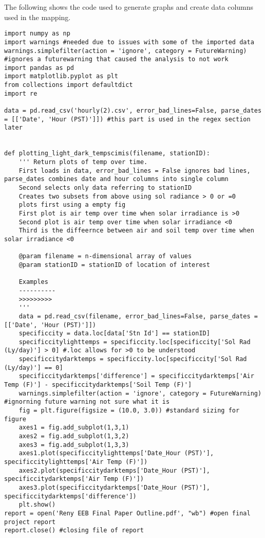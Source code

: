 \documentclass[letterpaper]{article}
\begin{document}
The following shows the code used to generate graphs and create data columns used in the mapping. 
\begin{lstlisting}
import numpy as np
import warnings #needed due to issues with some of the imported data 
warnings.simplefilter(action = 'ignore', category = FutureWarning) #ignores a futurewarning that caused the analysis to not work
import pandas as pd
import matplotlib.pyplot as plt
from collections import defaultdict
import re 

data = pd.read_csv('hourly(2).csv', error_bad_lines=False, parse_dates = [['Date', 'Hour (PST)']]) #this part is used in the regex section later


def plotting_light_dark_tempscimis(filename, stationID):
    ''' Return plots of temp over time.
    First loads in data, error_bad_lines = False ignores bad lines, parse_dates combines date and hour columns into single column
    Second selects only data referring to stationID
    Creates two subsets from above using sol radiance > 0 or =0
    plots first using a empty fig
    First plot is air temp over time when solar irradiance is >0
    Second plot is air temp over time when solar irradiance <0
    Third is the diffeernce between air and soil temp over time when solar irradiance <0
    
    @param filename = n-dimensional array of values
    @param stationID = stationID of location of interest
    
    Examples
    ----------
    >>>>>>>>> 
    ''' 
    data = pd.read_csv(filename, error_bad_lines=False, parse_dates = [['Date', 'Hour (PST)']])
    specificcity = data.loc[data['Stn Id'] == stationID]
    specificcitylighttemps = specificcity.loc[specificcity['Sol Rad (Ly/day)'] > 0] #.loc allows for >0 to be understood
    specificcitydarktemps = specificcity.loc[specificcity['Sol Rad (Ly/day)'] == 0]
    specificcitydarktemps['difference'] = specificcitydarktemps['Air Temp (F)'] - specificcitydarktemps['Soil Temp (F)']
    warnings.simplefilter(action = 'ignore', category = FutureWarning) #ignorning future warning not sure what it is
    fig = plt.figure(figsize = (10.0, 3.0)) #standard sizing for figure
    axes1 = fig.add_subplot(1,3,1) 
    axes2 = fig.add_subplot(1,3,2)
    axes3 = fig.add_subplot(1,3,3)
    axes1.plot(specificcitylighttemps['Date_Hour (PST)'], specificcitylighttemps['Air Temp (F)'])
    axes2.plot(specificcitydarktemps['Date_Hour (PST)'], specificcitydarktemps['Air Temp (F)'])
    axes3.plot(specificcitydarktemps['Date_Hour (PST)'], specificcitydarktemps['difference'])
    plt.show()
report = open('Reny EEB Final Paper Outline.pdf', "wb") #open final project report
report.close() #closing file of report
\end{lstlisting}
\end{document}
